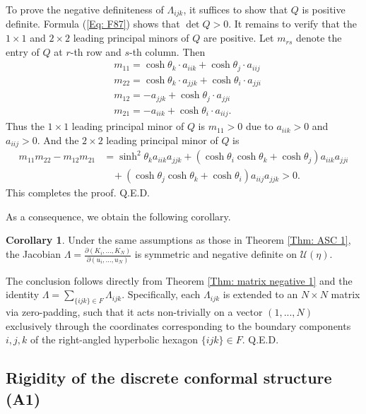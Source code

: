 \documentclass[12pt]{amsart}
\theoremstyle{definition}
\newtheorem{corollary}[theorem]{Corollary}
\def\qed{\hfill{Q.E.D.}\smallskip}
\begin{document}
To prove the negative definiteness of $\Lambda_{ijk}$,
it suffices to show that $Q$ is positive definite.
Formula (\ref{Eq: F87}) shows that $\det Q>0$.
It remains to verify that the $1\times 1$ and $2\times 2$ leading principal minors of $Q$ are positive. 
Let $m_{rs}$ denote the entry of $Q$ at $r$-th row and $s$-th column.
Then
\begin{equation*}
\begin{aligned}
&m_{11}=\cosh \theta_k\cdot a_{iik}+\cosh \theta_j\cdot a_{iij}\\
&m_{22}=\cosh \theta_k\cdot a_{jjk}+\cosh \theta_i\cdot a_{jji}\\
&m_{12}=-a_{jjk}+\cosh \theta_j\cdot a_{jji}\\
&m_{21}=-a_{iik}+\cosh \theta_i\cdot a_{iij}.
\end{aligned}
\end{equation*}
Thus the $1\times 1$ leading principal minor of $Q$ is $m_{11}>0$ due to $a_{iik}>0$ and $a_{iij}>0$.
And the $2\times 2$ leading principal minor of $Q$ is
\begin{equation*}
\begin{aligned}
m_{11}m_{22}-m_{12}m_{21}
&=\sinh^2 \theta_ka_{iik}a_{jjk}
+(\cosh \theta_i\cosh\theta_k+\cosh \theta_j)a_{iik}a_{jji}\\
&\ \ \ \ +(\cosh \theta_j\cosh\theta_k+\cosh \theta_i)a_{iij}a_{jjk}
>0.
\end{aligned}
\end{equation*}
This completes the proof.
\qed

As a consequence, we obtain the following corollary.
\begin{corollary}\label{Cor: matrix 1}
Under the same assumptions as those in Theorem \ref{Thm: ASC 1},
the Jacobian $\Lambda=\frac{\partial (K_i,..., K_N)}{\partial(u_i,...,u_N)}$ is symmetric and negative definite on $\mathcal{U}(\eta)$.
\end{corollary}
\proof
The conclusion follows directly from Theorem \ref{Thm: matrix negative 1} and the identity $\Lambda=\sum_{\{ijk\}\in F}\Lambda_{ijk}$.
Specifically, each $\Lambda_{ijk}$ is extended to an $N\times N$ matrix via zero-padding, such that it acts non-trivially on a vector $(1,...,N)$ exclusively through the coordinates corresponding to the boundary components $i,j,k$ of the right-angled hyperbolic hexagon $\{ijk\}\in F$.
\qed


\subsection{Rigidity of the discrete conformal structure (A1)}
\end{document}
